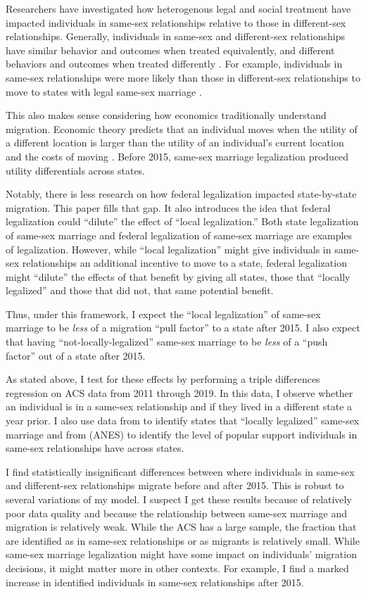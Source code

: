 \documentclass[12pt,letterpaper]{article}
\begin{document}
Researchers have investigated how heterogenous legal and social treatment have impacted individuals in same-sex relationships relative to those in different-sex relationships. Generally, individuals in same-sex and different-sex relationships have similar behavior and outcomes when treated equivalently, and different behaviors and outcomes when treated differently \citep{2}. For example, individuals in same-sex relationships were more likely than those in different-sex relationships to move to states with legal same-sex marriage \citep{1, 12}.

This also makes sense considering how economics traditionally understand migration. Economic theory predicts that an individual moves when the utility of a different location is larger than the utility of an individual’s current location and the costs of moving \citep{8, 12}. Before 2015, same-sex marriage legalization produced utility differentials across states.

Notably, there is less research on how federal legalization impacted state-by-state migration. This paper fills that gap. It also introduces the idea that federal legalization could “dilute” the effect of “local legalization.” Both state legalization of same-sex marriage and federal legalization of same-sex marriage are examples of legalization. However, while “local legalization” might give individuals in same-sex relationships an additional incentive to move to a state, federal legalization might “dilute” the effects of that benefit by giving all states, those that “locally legalized” and those that did not, that same potential benefit. 

Thus, under this framework, I expect the “local legalization” of same-sex marriage to be \textit{less} of a migration “pull factor” to a state after 2015. I also expect that having “not-locally-legalized” same-sex marriage to be \textit{less} of a “push factor” out of a state after 2015.

As stated above, I test for these effects by performing a triple differences regression on ACS data from 2011 through 2019. In this data, I observe whether an individual is in a same-sex relationship and if they lived in a different state a year prior. I also use data from \citet{1} to identify states that “locally legalized” same-sex marriage and from (ANES)  to identify the level of popular support individuals in same-sex relationships have across states.

I find statistically insignificant differences between where individuals in same-sex and different-sex relationships migrate before and after 2015. This is robust to several variations of my model. I suspect I get these results because of relatively poor data quality and because the relationship between same-sex marriage and migration is relatively weak. While the ACS has a large sample, the fraction that are identified as in same-sex relationships or as migrants is relatively small. While same-sex marriage legalization might have some impact on individuals’ migration decisions, it might matter more in other contexts. For example, I find a marked increase in identified individuals in same-sex relationships after 2015. 
\end{document}
